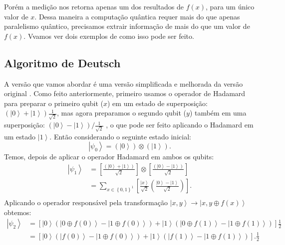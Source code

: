 Porém a medição nos retorna apenas um dos resultados de $f\left(x\right)$, para um único valor de $x$. Dessa maneira a computação quântica requer mais do que apenas paralelismo quântico, precisamos extrair informação de mais do que um valor de $f\left(x\right)$. Vvamos ver dois exemplos de como isso pode ser feito.

\subsection{Algoritmo de Deutsch}

A versão que vamos abordar é uma versão simplificada e melhorada da versão original \cite{nielsen2000quantum}. Como feito anteriormente, primeiro usamos o operador de Hadamard  para preparar o primeiro qubit ($x$) em um estado de superposição: $\left(\left|0\right\rangle +\left|1\right\rangle \right)\frac{1}{\sqrt{2}}$, mas agora preparamos o segundo qubit ($y$)  também em uma superposição: $\left(\left|0\right\rangle -\left|1\right\rangle \right)/\frac{1}{\sqrt{2}}$ , o que pode ser feito aplicando o Hadamard em um estado $\left|1\right\rangle $.  Então considerando o seguinte estado inicial: 
\begin{equation}
\left|\psi_{0}\right\rangle =\left(\left|0\right\rangle \right)\otimes\left(\left|1\right\rangle \right)
\label{anterior0}
. \end{equation}
Temos, depois de aplicar o operador Hadamard em ambos os qubits:
\begin{equation}
\begin{split}
\left|\psi_{1}\right\rangle & =\left[\frac{\left(\left|0\right\rangle +\left|1\right\rangle \right)}{\sqrt{2}}\right]\otimes\left[\frac{\left(\left|0\right\rangle -\left|1\right\rangle \right)}{\sqrt{2}}\right] \\
& =\sum_{x\in\left\{ 0,1\right\} ^{1}}\left[\frac{\left|x\right\rangle }{\sqrt{2}}\left(\frac{\left|0\right\rangle -\left|1\right\rangle }{\sqrt{2}}\right)\right]. \\
\end{split}
\label{anterior}
\end{equation}
Aplicando o operador responsável pela transformação  $\left|x,y\right\rangle \rightarrow\left|x,y\oplus f\left(x\right)\right\rangle $ obtemos:
\begin{equation}
\begin{split}
\left|\psi_{2}\right\rangle & =\left[\left|0\right\rangle \left(\left|0\oplus f\left(0\right)\right\rangle -\left|1\oplus f\left(0\right)\right\rangle \right)+\left|1\right\rangle \left(\left|0\oplus f\left(1\right)\right\rangle -\left|1\oplus f\left(1\right)\right\rangle \right)\right]\frac{1}{2} \\
&  =\left[\left|0\right\rangle \left(\left|f\left(0\right)\right\rangle -\left|1\oplus f\left(0\right)\right\rangle \right)+\left|1\right\rangle \left(\left|f\left(1\right)\right\rangle -\left|1\oplus f\left(1\right)\right\rangle \right)\right].\frac{1}{2} \\
\end{split}
\end{equation}
